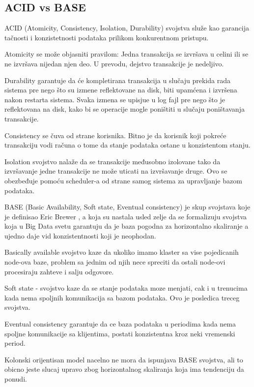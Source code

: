 \documentclass[12pt,oneside]{memoir}
\begin{document}
\subsection{ACID vs BASE}

ACID (Atomicity, Consistency, Isolation, Durability) svojstva služe kao garancija tačnosti i konzistetnosti podataka prilikom konkurentnom pristupu. 

Atomicity se može objasniti pravilom: Jedna transakcija se izvršava u celini ili se ne izvršava nijedan njen deo. U prevodu, dejstvo transakcije je nedeljivo. 

Durability garantuje da će kompletirana transakcija u slučaju prekida rada sistema pre nego što su izmene reflektovane na disk, biti upamćena i izvršena nakon restarta sistema. Svaka izmena se upisjue u log fajl pre nego što je reflektovana na disk, kako bi se operacije mogle poništiti u slučaju poništavanja transakcije.

Consistency se čuva od strane korisnika. Bitno je da korisnik koji pokreće transakciju vodi računa o tome da stanje podataka ostane u konzistentom stanju.

Isolation svojstvo nalaže da se transakcije međusobno izolovane tako da izvršavanje jedne transakcije ne može uticati na izvršavanje druge. Ovo se obezbeđuje pomoću scheduler-a od strane samog sistema za upravljanje bazom podataka.

BASE (Basic Availability, Soft state, Eventual consistency) je skup svojstava koje je definisao Eric Brewer , a koja su nastala usled zelje da se formalizuju svojstva koja u Big Data svetu garantuju da je baza pogodna za horizontalno skaliranje a ujedno daje vid konzistentnosti koji je neophodan. 

Basically available  svojstvo kaze da ukoliko imamo klaster sa vise pojedicanih node-ova baze, problem sa jednim od njih nece spreciti da ostali node-ovi procesiraju zahteve i salju odgovore.

Soft state -  svojstvo kaze da se stanje podataka moze menjati, cak i u trenucima kada nema spoljnih komunikacija sa bazom podataka. Ovo je posledica treceg svojstva.

Eventual consistency garantuje da ce baza podataka u periodima kada nema spoljne komunikacije sa klijentima, postati konzistentna kroz neki vremenski period. 

Kolonski orijentisan model nacelno ne mora da ispunjava BASE svojstva, ali to obicno jeste slucaj upravo zbog horizontalnog skaliranja koja ima tendenciju da ponudi.
\end{document}
